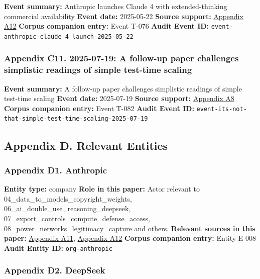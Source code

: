 \documentclass[
  american,
  11pt,
  letterpaper,
]{article}
\begin{document}
\textbf{Event summary:} Anthropic launches Claude 4 with
extended-thinking commercial availability \textbf{Event date:}
2025-05-22 \textbf{Source support:}
\hyperref[ch-06-appendix-a12-introducing-claude-4]{Appendix A12}
\textbf{Corpus companion entry:} Event T-076 \textbf{Audit Event ID:}
\texttt{event-anthropic-claude-4-launch-2025-05-22}

\subsubsection{Appendix C11. 2025-07-19: A follow-up paper challenges
simplistic readings of simple test-time
scaling}\label{ch-06-appendix-c11-2025-07-19-a-follow-up-paper-challenges-simplistic-readings-of-simple-test-time-scaling}

\textbf{Event summary:} A follow-up paper challenges simplistic readings
of simple test-time scaling \textbf{Event date:} 2025-07-19
\textbf{Source support:}
\hyperref[ch-06-appendix-a8-it-s-not-that-simple-an-analysis-of-simple-test-time-scaling]{Appendix
A8} \textbf{Corpus companion entry:} Event T-082 \textbf{Audit Event
ID:} \texttt{event-its-not-that-simple-test-time-scaling-2025-07-19}

\subsection{Appendix D. Relevant
Entities}\label{appendix-d.-relevant-entities-6}

\subsubsection{Appendix D1.
Anthropic}\label{ch-06-appendix-d1-anthropic}

\textbf{Entity type:} company \textbf{Role in this paper:} Actor
relevant to 04\_data\_to\_models\_copyright\_weights,
06\_ai\_double\_use\_reasoning\_deepseek,
07\_export\_controls\_compute\_defense\_access,
08\_power\_networks\_legitimacy\_capture and others. \textbf{Relevant
sources in this paper:}
\hyperref[ch-06-appendix-a11-plans-pricing-claude-by-anthropic]{Appendix
A11}, \hyperref[ch-06-appendix-a12-introducing-claude-4]{Appendix A12}
\textbf{Corpus companion entry:} Entity E-008 \textbf{Audit Entity ID:}
\texttt{org-anthropic}

\subsubsection{Appendix D2. DeepSeek}\label{ch-06-appendix-d2-deepseek}
\end{document}
